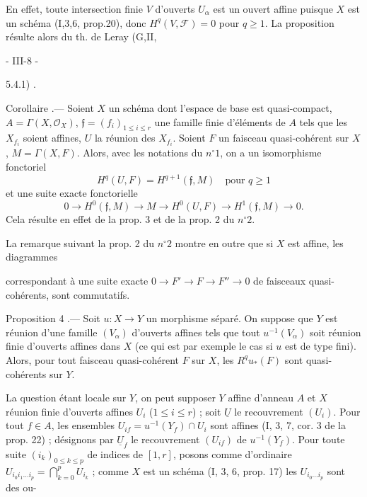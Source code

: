 En effet, toute intersection finie $V$ d'ouverts $U_\alpha$ est un ouvert affine puisque $X$ est un schéma (I,3,6, prop.20), donc $H^q(V, \mathcal{F})=0$ pour $q \ge 1$. La proposition résulte alors du th. de Leray (G,II,

\newpage


- III-8 -

5.4.1) .

Corollaire .— Soient $X$ un schéma dont l'espace de base est quasi-compact, $A = \Gamma(X, \mathcal{O}_X)$, $\mathfrak{f} = (f_i)_{1 \le i \le r}$ une famille finie d'éléments de $A$ tels que les $X_{f_i}$ soient affines, $U$ la réunion des $X_{f_i}$. Soient $F$ un faisceau quasi-cohérent sur $X$, $M = \Gamma(X, F)$. Alors, avec les notations du $n^\circ 1$, on a un isomorphisme fonctoriel
$$H^q(U, F) = H^{q+1}(\mathfrak{f}, M) \quad \text{pour } q \ge 1$$
et une suite exacte fonctorielle
$$0 \to H^0(\mathfrak{f}, M) \to M \to H^0(U, F) \to H^1(\mathfrak{f}, M) \to 0 .$$
Cela résulte en effet de la prop. 3 et de la prop. 2 du $n^\circ 2$.

La remarque suivant la prop. 2 du $n^\circ 2$ montre en outre que si $X$ est affine, les diagrammes
correspondant à une suite exacte $0 \to F' \to F \to F'' \to 0$ de faisceaux quasi-cohérents, sont commutatifs.

Proposition 4 .— Soit $u: X \to Y$ un morphisme séparé. On suppose que $Y$ est réunion d'une famille $(V_\alpha)$ d'ouverts affines tels que tout $u^{-1}(V_\alpha)$ soit réunion finie d'ouverts affines dans $X$ (ce qui est par exemple le cas si $u$ est de type fini). Alors, pour tout faisceau quasi-cohérent $F$ sur $X$, les $R^q u_*(F)$ sont quasi-cohérents sur $Y$.

La question étant locale sur $Y$, on peut supposer $Y$ affine d'anneau $A$ et $X$ réunion finie d'ouverts affines $U_i$ ($1 \le i \le r$) ; soit $\underline{U}$ le recouvrement $(U_i)$. Pour tout $f \in A$, les ensembles $U_{if} = u^{-1}(Y_f) \cap U_i$ sont affines (I, 3, 7, cor. 3 de la prop. 22) ; désignons par $\underline{U}_f$ le recouvrement $(U_{if})$ de $u^{-1}(Y_f)$. Pour toute suite $(i_k)_{0 \le k \le p}$ de indices de $[1, r]$, posons comme d'ordinaire $U_{i_0 i_1 \dots i_p} = \bigcap_{k=0}^p U_{i_k}$ ; comme $X$ est un schéma (I, 3, 6, prop. 17) les $U_{i_0 \dots i_p}$ sont des ou-

